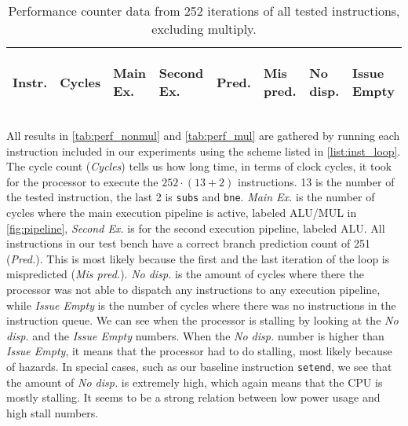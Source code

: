 \begin{table}
    \centering
    \begin{tabular}{|p{0.7cm}|R{0.8cm}R{0.6cm}R{0.85cm}R{0.6cm}R{0.45cm}R{0.75cm}R{0.72cm}|}
        \hline
        \centering
        Instr. &
        \centering
        Cycles &
        \centering
        Main Ex. &
        \centering
        Second Ex. &
        \centering
        Pred.&
        \centering
        Mis pred.&
        \centering
        No disp. &
        \begin{centering}
        Issue Empty
        \end{centering}
        \\
        \hline
        
        \hline
    \end{tabular}
    \caption{Performance counter data from 252 iterations of all tested
    instructions, excluding multiply.}
    \label{tab:perf_nonmul}
    \hfill
\end{table}


All results in \autoref{tab:perf_nonmul} and \autoref{tab:perf_mul} are gathered
by running each instruction included in our experiments using the scheme listed
in \autoref{list:inst_loop}.  The cycle count (\emph{Cycles}) tells us how long
time, in terms of clock cycles, it took for the processor to execute the $252
\cdot (13+2)$ instructions. 13 is the number of the tested instruction, the last
2 is \texttt{subs} and \texttt{bne}.  \emph{Main Ex.} is the number of cycles
where the main execution pipeline is active, labeled ALU/MUL in
\autoref{fig:pipeline}, \emph{Second Ex.} is for the second execution pipeline,
labeled ALU.  All instructions in our test bench have a correct branch
prediction count of 251 (\emph{Pred.}). This is most likely because the first
and the last iteration of the loop is mispredicted (\emph{Mis pred.}).  \emph{No
disp.} is the amount of cycles where there the processor was not able to
dispatch any instructions to any execution pipeline, while \emph{Issue Empty} is
the number of cycles where there was no instructions in the instruction queue.
We can see when the processor is stalling by looking at the \emph{No disp.} and
the \emph{Issue Empty} numbers.  When the \emph{No disp.} number is higher than
\emph{Issue Empty}, it means that the processor had to do stalling, most likely
because of hazards. In special cases, such as our baseline instruction
\texttt{setend}, we see that the amount of \emph{No disp.} is extremely high,
which again means that the CPU is mostly stalling. It seems to be a strong
relation between low power usage and high stall numbers.

